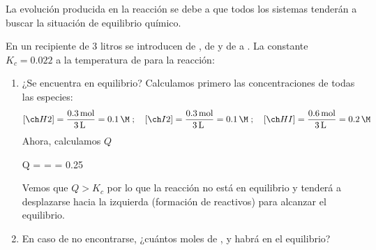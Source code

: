La evolución producida en la reacción se debe a que todos los sistemas tenderán a buscar la situación de equilibrio químico.

\begin{example}
    En un recipiente de 3 litros se introducen  de ,  de  y  de  a .
    La constante  $K_c = 0.022$ a la temperatura de  para la reacción:
    \begin{centeredequation}
    \end{centeredequation}
    \begin{enumerate}[label=\letraminuscula]
            \item ¿Se encuentra en equilibrio?
            Calculamos primero las concentraciones de todas las especies:
            \begin{gather*}
                \conc{H2} = \dfrac{\moles{0.3}}{\volumen[l]{3}} = \concentracion[m]{0.1}; \quad \conc{I2} = \dfrac{\moles{0.3}}{\volumen[l]{3}} = \concentracion[m]{0.1}; \quad \conc{HI} = \dfrac{\moles{0.6}}{\volumen[l]{3}} = \concentracion[m]{0.2}
            \end{gather*}
            Ahora, calculamos \( Q \)
            \begin{centeredequation}
                Q =  =  = 0.25
            \end{centeredequation}
            Vemos que $Q>K_c$ por lo que la reacción no está en equilibrio y tenderá a desplazarse hacia la izquierda (formación de reactivos) para alcanzar el equilibrio.
            \item En caso de no encontrarse, ¿cuántos moles de ,  y  habrá en el equilibrio?


\end{enumerate}
\end{example}
